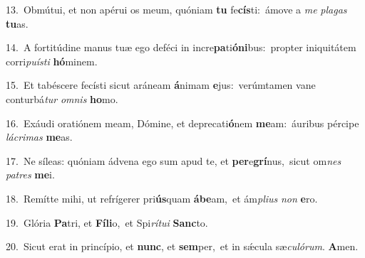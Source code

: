 {\numbfont\textcolor{\numbcolor}{13.}}~Obmútui, et non apérui os meum, quóniam \textbf{tu} fe\-\textbf{cís}\-ti:~\star ámove a \textit{me} \textit{pla}\-\textit{gas} \textbf{tu}\-as.\par
{\numbfont\textcolor{\numbcolor}{14.}}~A fortitúdine manus tuæ ego deféci in incre\-\textbf{pa}\-ti\-\textbf{ó}\-\textbf{ni}bus:~\star propter iniquitátem corri\-\textit{pu}\-\textit{ís}\textit{ti} \textbf{hó}\-minem.\par
{\numbfont\textcolor{\numbcolor}{15.}}~Et tabéscere fecísti sicut aráneam \textbf{á}\-nimam \textbf{e}\-jus:~\star verúmtamen vane conturbá\textit{tur} \textit{om}\-\textit{nis} \textbf{ho}\-mo.\par
{\numbfont\textcolor{\numbcolor}{16.}}~Exáudi oratiónem meam, Dómine, et deprecati\-\textbf{ó}\-nem \textbf{me}\-am:~\star áuribus pércipe \textit{lá}\-\textit{cri}\textit{mas} \textbf{me}\-as.\par
{\numbfont\textcolor{\numbcolor}{17.}}~Ne síleas: quóniam ádvena ego sum apud te, et \textbf{per}\-e\-\textbf{grí}\-nus,~\star sicut om\textit{nes} \textit{pa}\-\textit{tres} \textbf{me}\-i.\par
{\numbfont\textcolor{\numbcolor}{18.}}~Remítte mihi, ut refrígerer pri\-\textbf{ús}\-quam \textbf{á}\-\textbf{be}am,~\star et ám\-\textit{pli}\-\textit{us} \textit{non} \textbf{e}\-ro.\par
{\numbfont\textcolor{\numbcolor}{19.}}~Glória \textbf{Pa}\-tri, et \textbf{Fí}\-\textbf{li}o,~\star et Spi\-\textit{rí}\-\textit{tu}\textit{i} \textbf{Sanc}\-to.\par
{\numbfont\textcolor{\numbcolor}{20.}}~Sicut erat in princípio, et \textbf{nunc}\-, et \textbf{sem}\-per,~\star et in sǽcula sæ\-\textit{cu}\-\textit{ló}\textit{rum}. \textbf{A}\-men.\par
